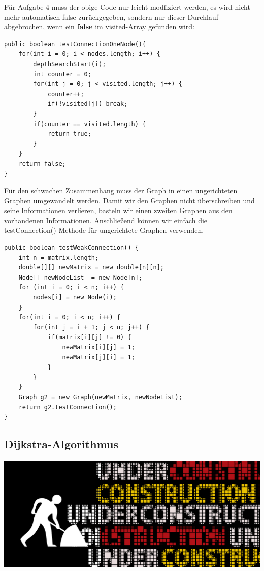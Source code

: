\documentclass{article}
\begin{document}
Für Aufgabe 4 muss der obige Code nur leicht modfiziert werden, es wird nicht mehr automatisch false zurückgegeben, sondern nur dieser Durchlauf abgebrochen, wenn ein \textbf{false} im visited-Array gefunden wird:
\begin{verbatim}
public boolean testConnectionOneNode(){
    for(int i = 0; i < nodes.length; i++) {
        depthSearchStart(i);
        int counter = 0;
        for(int j = 0; j < visited.length; j++) {
            counter++;
            if(!visited[j]) break;
        }
        if(counter == visited.length) {
            return true;
        }
    }
    return false;
}
\end{verbatim}
Für den schwachen Zusammenhang muss der Graph in einen ungerichteten Graphen umgewandelt werden. Damit wir den Graphen nicht überschreiben und seine Informationen verlieren, basteln wir einen zweiten Graphen aus den vorhandenen Informationen. Anschließend können wir einfach die testConnection()-Methode für ungerichtete Graphen verwenden.
\begin{verbatim}
public boolean testWeakConnection() {
    int n = matrix.length;
    double[][] newMatrix = new double[n][n];
    Node[] newNodeList  = new Node[n];
    for (int i = 0; i < n; i++) {
        nodes[i] = new Node(i);
    }
    for(int i = 0; i < n; i++) {
        for(int j = i + 1; j < n; j++) {
            if(matrix[i][j] != 0) {
                newMatrix[i][j] = 1;
                newMatrix[j][i] = 1;
            }
        }
    }
    Graph g2 = new Graph(newMatrix, newNodeList);
    return g2.testConnection();
}
\end{verbatim}



\subsection{Dijkstra-Algorithmus}
\begin{center}
    \includegraphics[scale=0.35]{../../media/under_construction.png}
\end{center}
\end{document}
